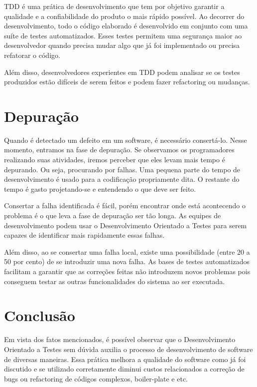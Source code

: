 \documentclass[12pt]{article}
\begin{document}
  TDD é uma prática de desenvolvimento que tem por objetivo garantir a
  qualidade e a confiabilidade do produto o mais rápido possível. Ao decorrer do
  desenvolvimento, todo o código elaborado é desenvolvido em conjunto com uma
  suíte de testes automatizados. Esses testes permitem uma segurança maior ao
  desenvolvedor quando precisa mudar algo que já foi implementado ou precisa 
  refatorar o código.

  Além disso, desenvolvedores experientes em TDD podem analisar se os testes 
  produzidos estão difíceis de serem feitos e podem fazer refactoring ou 
  mudanças.

  \section{Depuração}

  Quando é detectado um defeito em um software, é necessário consertá-lo. Nesse
  momento, entramos na fase de depuração. Se observamos os programadores 
  realizando suas atividades, iremos perceber que eles levam mais tempo é 
  depurando. Ou seja, procurando por falhas.
  Uma pequena parte do tempo de desenvolvimento é usado para a 
  codificação propriamente dita. O 
  restante do tempo é gasto projetando-se e entendendo o que deve ser feito.

  Consertar a falha identificada é fácil, porém encontrar onde está acontecendo
  o problema é o que leva a fase de depuração ser tão longa. As equipes de 
  desenvolvimento podem usar o Desenvolvimento Orientado a Testes
  para serem capazes de identificar mais rapidamente essas falhas.

  Além disso, ao se consertar uma falha local, existe uma possibilidade (entre
  20 a 50 por cento) de se introduzir uma nova falha. As bases de testes 
  automatizados facilitam a garantir que as correções feitas não introduzem 
  novos problemas pois conseguem testar as outras funcionalidades do sistema
  ao ser executada.

  \section{Conclusão}

  Em vista dos fatos mencionados, é possível observar que o Desenvolvimento Orientado a Testes 
  sem dúvida auxilia o processo de desenvolvimento de software de diversas
  maneiras. Essa prática melhora a qualidade do software como já foi discutido
  e se utilizado corretamente diminui custos relacionados a correção de bugs 
  ou refactoring de códigos complexos, boiler-plate e etc.
\end{document}
